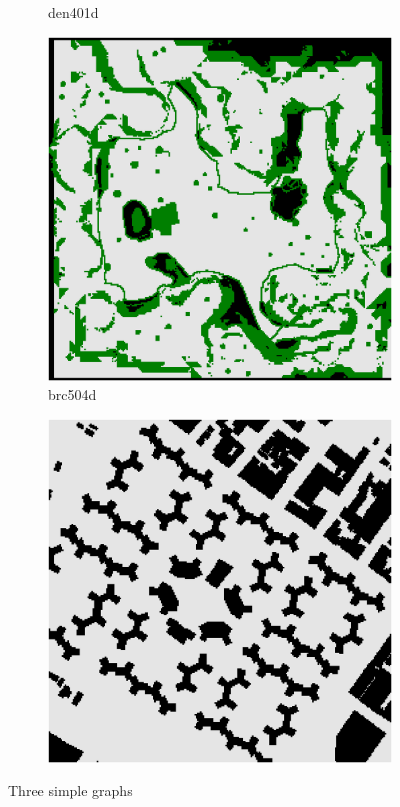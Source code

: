 \documentclass[11pt]{article}
\begin{document}
\begin{figure}
\begin{subfigure}[b]{0.24\textwidth}
            \caption{den401d}
        \end{subfigure}
        \hfill
        \begin{subfigure}[b]{0.24\textwidth}
            \centering
            \includegraphics[width=\textwidth]{../maps/brc504d}
            \caption{brc504d}
        \end{subfigure}
        \begin{subfigure}[b]{0.24\textwidth}
            \centering
            \includegraphics[width=\textwidth]{../maps/NewYork_1_256}
        \end{subfigure}
        \caption{Three simple graphs}
        \label{fig:three graphs}
    \end{figure}
\end{document}
